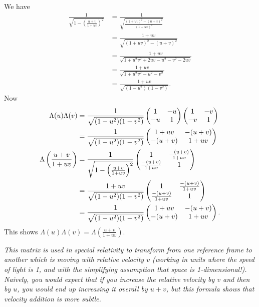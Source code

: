 \documentclass{article}
\begin{document}
\begin{Solution}\label{sol:exr:lorentz}
We have
\begin{align*}
\frac{1}{\sqrt{1-\left(\frac{u+v}{1+uv}\right)^2}}&=\frac{1}{\sqrt{\frac{(1+uv)^2-(u+v)^2}{(1+uv)^2}}}\\
&=\frac{1+uv}{\sqrt{(1+uv)^2-(u+v)^2}}\\
&=\frac{1+uv}{\sqrt{1+u^2v^2+2uv-u^2-v^2-2uv}}\\
&=\frac{1+uv}{\sqrt{1+u^2v^2-u^2-v^2}}\\
&=\frac{1+uv}{\sqrt{(1-u^2)(1-v^2)}}.
\end{align*}
Now
\begin{align*}
\Lambda(u)\Lambda(v)&=\frac{1}{\sqrt{(1-u^2)(1-v^2)}}\begin{pmatrix} 1 & -u \\ -u & 1 \end{pmatrix}\begin{pmatrix} 1 & -v \\ -v & 1\end{pmatrix}\\
&=\frac{1}{\sqrt{(1-u^2)(1-v^2)}}\begin{pmatrix} 1+uv & -(u+v) \\ -(u+v) & 1+uv\end{pmatrix}\\
\Lambda\left(\frac{u+v}{1+uv}\right)&=\frac{1}{\sqrt{1-\left(\frac{u+v}{1+uv}\right)^2}}\begin{pmatrix} 1 & \frac{-(u+v)}{1+uv} \\ \frac{-(u+v)}{1+uv} & 1 \end{pmatrix}\\
&=\frac{1+uv}{\sqrt{(1-u^2)(1-v^2)}}\begin{pmatrix} 1 & \frac{-(u+v)}{1+uv} \\ \frac{-(u+v)}{1+uv} & 1 \end{pmatrix}\\
&=\frac{1}{\sqrt{(1-u^2)(1-v^2)}}\begin{pmatrix} 1+uv & -(u+v) \\ -(u+v) & 1+uv \end{pmatrix}.
\end{align*}
This shows
\(\Lambda(u)\Lambda(v)=\Lambda\left(\frac{u+v}{1+uv}\right)\).


{\em This matrix is used in special relativity to transform from one
reference frame to another which is moving with relative velocity
\(v\) (working in units where the speed of light is 1, and with the
simplifying assumption that space is 1-dimensional!). Naively, you
would expect that if you increase the relative velocity by \(v\) and
then by \(u\), you would end up increasing it overall by \(u+v\),
but this formula shows that velocity addition is more subtle.}


\end{Solution}
\end{document}
